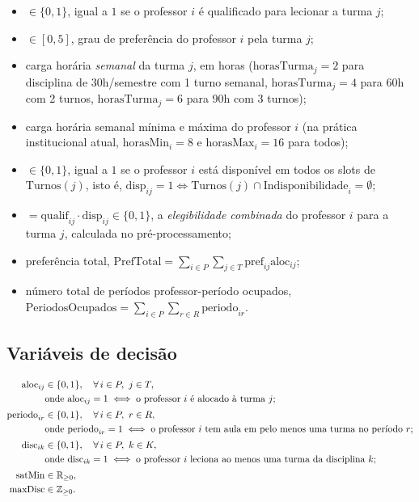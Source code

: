 \documentclass[11pt,a4paper]{article}
\begin{document}
\begin{itemize}[leftmargin=2.2cm]
  \item[$\mathrm{qualif}_{ij}$] $\in \{0,1\}$, igual a $1$ se o professor $i$ é qualificado para lecionar a turma $j$;
  \item[$\mathrm{pref}_{ij}$] $\in [0,5]$, grau de preferência do professor $i$ pela turma $j$;
  \item[$\mathrm{horasTurma}_{j}$] carga horária \emph{semanal} da turma $j$, em horas ($\mathrm{horasTurma}_{j}=2$ para disciplina de 30h/semestre com 1 turno semanal, $\mathrm{horasTurma}_{j}=4$ para 60h com 2 turnos, $\mathrm{horasTurma}_{j}=6$ para 90h com 3 turnos);
  \item[$\mathrm{horasMin}_{i}, \mathrm{horasMax}_{i}$] carga horária semanal mínima e máxima do professor $i$ (na prática institucional atual, $\mathrm{horasMin}_{i}=8$ e $\mathrm{horasMax}_{i}=16$ para todos);
  \item[$\mathrm{disp}_{ij}$] $\in \{0,1\}$, igual a $1$ se o professor $i$ está disponível em todos os slots de $\text{Turnos}(j)$, isto é, $\mathrm{disp}_{ij}=1 \iff \text{Turnos}(j)\cap\text{Indisponibilidade}_i=\emptyset$;
  \item[$\mathrm{eleg}_{ij}$] $=\mathrm{qualif}_{ij}\cdot \mathrm{disp}_{ij}\in\{0,1\}$, a \emph{elegibilidade combinada} do professor $i$ para a turma $j$, calculada no pré-processamento;
  \item[$\mathrm{PrefTotal}$] preferência total, $\mathrm{PrefTotal}=\sum_{i\in P}\sum_{j\in T}\mathrm{pref}_{ij}\mathrm{aloc}_{ij}$;
  \item[$\mathrm{PeriodosOcupados}$] número total de períodos professor-período ocupados, $\mathrm{PeriodosOcupados}=\sum_{i\in P}\sum_{r\in R}\mathrm{periodo}_{ir}$.
\end{itemize}

\subsection{Variáveis de decisão}
\begin{align}
\mathrm{aloc}_{ij} &\in \{0,1\}, \quad \forall\, i \in P,\ j \in T, \notag\\
&\text{onde } \mathrm{aloc}_{ij}=1 \iff \text{o professor }i\text{ é alocado à turma }j; \notag\\[2pt]
\mathrm{periodo}_{ir} &\in \{0,1\}, \quad \forall\, i \in P,\ r \in R, \notag\\
&\text{onde } \mathrm{periodo}_{ir}=1 \iff \text{o professor }i\text{ tem aula em pelo menos uma turma no período }r; \notag\\[2pt]
\mathrm{disc}_{ik} &\in \{0,1\}, \quad \forall\, i \in P,\ k \in K, \notag\\
&\text{onde } \mathrm{disc}_{ik}=1 \iff \text{o professor }i\text{ leciona ao menos uma turma da disciplina }k; \notag\\[2pt]
\mathrm{satMin} &\in \mathbb{R}_{\geq 0}, \notag\\
\mathrm{maxDisc} &\in \mathbb{Z}_{\geq 0}. \notag
\end{align}
\end{document}
